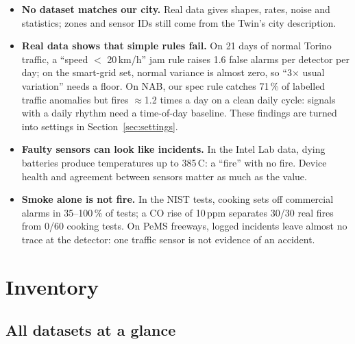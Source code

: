 \documentclass[10pt,a4paper]{article}
\begin{document}
\begin{itemize}
\item \textbf{No dataset matches our city.} Real data gives shapes, rates, noise and statistics; zones and sensor IDs still come from the Twin's city description.
\item \textbf{Real data shows that simple rules fail.} On 21 days of normal Torino traffic, a ``speed $<$ 20\,km/h'' jam rule raises 1.6 false alarms per detector per day; on the smart-grid set, normal variance is almost zero, so ``3$\times$ usual variation'' needs a floor. On NAB, our spec rule catches 71\,\% of labelled traffic anomalies but fires $\approx$1.2 times a day on a clean daily cycle: signals with a daily rhythm need a time-of-day baseline. These findings are turned into settings in Section~\ref{sec:settings}.
\item \textbf{Faulty sensors can look like incidents.} In the Intel Lab data, dying batteries produce temperatures up to 385\,\textdegree C: a ``fire'' with no fire. Device health and agreement between sensors matter as much as the value.
\item \textbf{Smoke alone is not fire.} In the NIST tests, cooking sets off commercial alarms in 35--100\,\% of tests; a CO rise of 10\,ppm separates 30/30 real fires from 0/60 cooking tests. On PeMS freeways, logged incidents leave almost no trace at the detector: one traffic sensor is not evidence of an accident.
\end{itemize}

\section{Inventory}

\subsection{All datasets at a glance}
\end{document}

